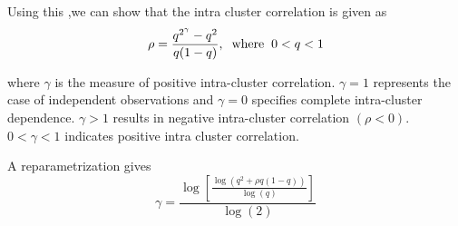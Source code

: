 \documentclass[12pt,oneside]{report}
\theoremstyle{definition}
\theoremstyle{mystyle}
\begin{document}
Using this ,we can show that the intra cluster correlation is given as
\begin{equation}\label{e5}
\rho=\frac{q^{2^{\gamma}}-q^{2}}{q(1-q)},\hspace{2mm}\text{where}\hspace{2mm} 0<q<1
\end{equation}

where $\gamma$ is the measure of positive intra-cluster correlation. $\gamma=1$ represents the case of independent observations and   $\gamma=0$ specifies complete intra-cluster  dependence. $\gamma > 1$ results in negative intra-cluster correlation $(\rho<0)$. $0<\gamma <1$ indicates positive intra cluster correlation. 

A reparametrization gives
\begin{equation}\label{e6}
\gamma=\displaystyle \frac{\log \left[\frac{\log \left( q^{2}+\rho q(1-q)\right)}{\log(q)}\right]}{\log(2)}
\end{equation}
\end{document}
